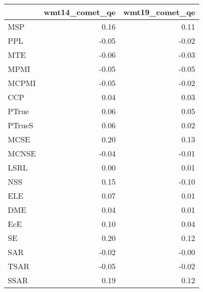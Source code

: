 \begin{tabular}{lrr}
\toprule
 & wmt14\_comet\_qe & wmt19\_comet\_qe \\
\midrule
MSP & 0.16 & 0.11 \\
PPL & -0.05 & -0.02 \\
MTE & -0.06 & -0.03 \\
MPMI & -0.05 & -0.05 \\
MCPMI & -0.05 & -0.02 \\
CCP & 0.04 & 0.03 \\
PTrue & 0.06 & 0.05 \\
PTrueS & 0.06 & 0.02 \\
MCSE & 0.20 & 0.13 \\
MCNSE & -0.04 & -0.01 \\
LSRL & 0.00 & 0.01 \\
NSS & 0.15 & -0.10 \\
ELE & 0.07 & 0.01 \\
DME & 0.04 & 0.01 \\
EcE & 0.10 & 0.04 \\
SE & 0.20 & 0.12 \\
SAR & -0.02 & -0.00 \\
TSAR & -0.05 & -0.02 \\
SSAR & 0.19 & 0.12 \\
\bottomrule
\end{tabular}

